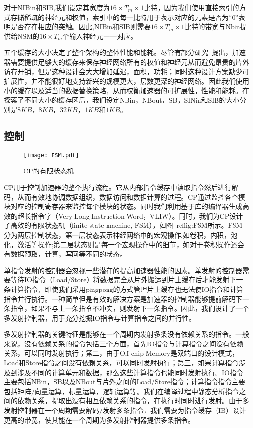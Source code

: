 对于NIBin和SIB,我们设定其宽度为$16\times T_m\times 1$比特，因为我们使用直接索引的方式存储稀疏的神经元和权值，索引中的每一比特用于表示对应的元素是否为“0”表明是否存在相应的突触。因此,NIBin和SIB则需要$16\times T_m\times 1$比特的带宽与Nbin提供给NSM的$16\times T_m$个输入神经元一一对应。

五个缓存的大小决定了整个架构的整体性能和能耗。尽管有部分研究~\cite{chen2014dadiannao,han2016eie}提出，加速器需要提供足够大的缓存来保存神经网络所有的权值和神经元从而避免昂贵的片外访存开销，但是这种设计会大大增加延迟，面积，功耗；同时这种设计方案缺少可扩展性，并不能很好地支持新兴的规模更大，层数更深的神经网络。因此我们使用小的缓存以及适当的数据替换策略，从而权衡加速器的可扩展性，性能和能耗。在探索了不同大小的缓存区后，我们设定NBin，NBout，SB，SINin和SIB的大小分别是$8KB$，$8KB$，$32KB$，$1KB$和$1KB$。

\subsection{控制}
\label{subsec:control}

\begin{figure}[h]
\centering
\texttt{[image: FSM.pdf]}
\caption{CP的有限状态机}
\label{fig:FSM}
\end{figure}

CP用于控制加速器的整个执行流程。它从内部指令缓存中读取指令然后进行解码，从而有效地协调数据组织，数据访问和数据计算的过程。CP通过监控各个模块对应的控制寄存器来监控每个模块的状态。同时我们利用基于库的编译器生成高效的超长指令字（Very Long Instruction Word，VLIW）。同时，我们为CP设计了高效的有限状态机（finite state machine, FSM），如图~ref{fig:FSM}所示。FSM分为两层控制状态，第一层状态表示神经网络中的宏观操作,如卷积，内积，池化，激活等操作;第二层状态则是每一个宏观操作中的细节，如对于卷积操作还会有数据预取，计算，写回等不同的状态。

单指令发射的控制器会忽视一些潜在的提高加速器性能的因素。单发射的控制器需要等待IO指令（Load/Store）将数据完全从片外搬运到片上缓存后才能发射下一条计算指令，即使我们采用pingpong的方式管理片上缓存也无法使IO指令和计算指令并行执行。一种简单但是有效的解决方案是加速器的控制器能够提前解码下一条指令，如果不与上一条指令不冲突，则发射下一条指令。因此，我们设计了一个多发射控制器，用于充分挖掘IO指令与计算指令之间的并行性。

多发射控制器的关键特征是能够在一个周期内发射多条没有依赖关系的指令。一般来说，没有依赖关系的指令包括三个方面，首先IO指令与计算指令之间没有依赖关系，可以同时发射执行；第二，由于Off-chip Memory是双端口的设计模式，Load和Store指令之间没有依赖关系，可以同时发射执行；第三，如果计算指令涉及到涉及不同的计算单元和数据，那么这些计算指令也能同时发射执行。IO指令主要包括NBin，SB以及NBout与片外之间的Load/Store指令；计算指令指令主要包括矩阵/向量运算，标量运算，逻辑运算等。我们在编译过程中静态分析指令之间的依赖关系，提取出没有相互依赖关系的指令，在执行时同时进行发射。由于多发射控制器在一个周期需要解码/发射多条指令，我们需要为指令缓存（IB）设计更高的带宽，使其能在一个周期为多发射控制器提供多条指令。

